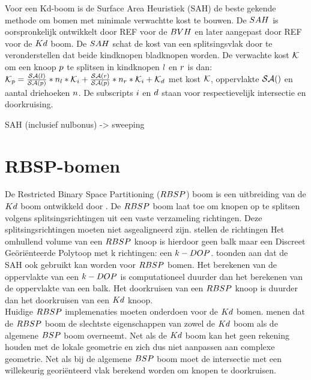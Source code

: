    Voor een Kd-boom is de Surface Area Heuristiek (SAH) de beste gekende methode om bomen met minimale verwachtte kost te bouwen.
    De $SAH$ is oorspronkelijk ontwikkelt door REF voor de $BVH$ en later aangepast door REF voor de $Kd$ boom. 
    De $SAH$ schat de kost van een splitsingsvlak door te veronderstellen dat beide kindknopen bladknopen worden. 
    De verwachte kost $\mathcal{K}$ om een knoop $p$ te splitsen in kindknopen ${l}$ en ${r}$ is dan: $\mathcal{K}_p = \frac{\mathcal{SA}(l)}{\mathcal{SA}(p)}*n_l*\mathcal{K}_i + \frac{\mathcal{SA}(r)}{\mathcal{SA}(p)}*n_r*\mathcal{K}_i + \mathcal{K}_d$ met kost $\mathcal{K}$, oppervlakte $\mathcal{SA}()$ en aantal driehoeken $n$.
    De subscripts ${i}$ en ${d}$ staan voor respectievelijk intersectie en doorkruising.

    SAH (inclusief nulbonus) -> sweeping
\section{RBSP-bomen}
    De Restricted Binary Space Partitioning ($RBSP$) boom is een uitbreiding van de $Kd$ boom ontwikkeld door \authorKammaje{ } \cite{Kammaje}.
    De $RBSP$ boom laat toe om knopen op te splitsen volgens splitsingsrichtingen uit een vaste verzameling richtingen.
    Deze splitsingsrichtingen moeten niet asgealigneerd zijn.
    \authorKammaje{ } stellen de richtingen %
    Het omhullend volume van een $RBSP$ knoop is hierdoor geen balk maar een Discreet Geöriënteerde Polytoop met k richtingen: een $k-DOP$. %
    \authorKammaje{ } toonden aan dat de SAH ook gebruikt kan worden voor $RBSP$ bomen. Het berekenen van de oppervlakte van een $k-DOP$ is computationeel duurder dan het berekenen van de oppervlakte van een balk. Het doorkruisen van een $RBSP$ knoop is duurder dan het doorkruisen van een $Kd$ knoop.
    \\

    Huidige $RBSP$ implemenaties moeten onderdoen voor de $Kd$ bomen. \authorIze{ } menen dat de $RBSP$ boom de slechtste eigenschappen van zowel de $Kd$ boom als de algemene $BSP$ boom overneemt. Net als de $Kd$ boom kan het geen rekening houden met de lokale geometrie en zich dus niet aanpassen aan complexe geometrie. Net als bij de algemene $BSP$ boom moet de intersectie met een willekeurig georiënteerd vlak berekend worden om knopen te doorkruisen.

